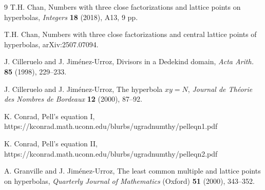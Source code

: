 \documentclass[12pt]{article}
\begin{document}
\begin{thebibliography}{9}
 T.H. Chan, Numbers with three close factorizations and lattice points on hyperbolas, {\it Integers} {\bf 18} (2018), A13, 9 pp.

 T.H. Chan, Numbers with three close factorizations and central lattice points of hyperbolas, arXiv:2507.07094. 

 J. Cilleruelo and J. Jim\'{e}nez-Urroz, Divisors in a Dedekind domain, {\it Acta Arith.} {\bf 85} (1998), 229--233.

 J. Cilleruelo and J. Jim\'{e}nez-Urroz, The hyperbola $x y = N$, {\it Journal de Th\'{e}orie des Nombres de Bordeaux} {\bf 12} (2000), 87--92.

 K. Conrad, Pell's equation I, \\
https://kconrad.math.uconn.edu/blurbs/ugradnumthy/pelleqn1.pdf

 K. Conrad, Pell's equation II, \\
https://kconrad.math.uconn.edu/blurbs/ugradnumthy/pelleqn2.pdf

 A. Granville and J. Jim\'{e}nez-Urroz, The least common multiple and lattice points on hyperbolas, {\it Quarterly Journal of Mathematics} (Oxford) {\bf 51} (2000), 343--352.
\end{thebibliography}
\end{document}
